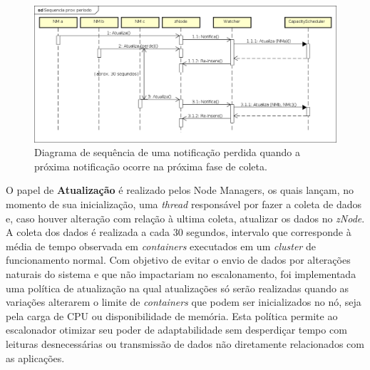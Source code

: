 \begin{figure}[!hbt]
   \centering
   \includegraphics[width=\textwidth]{figuras/seq-prox-per.png}
   \caption{Diagrama de sequência de uma notificação perdida quando a próxima notificação ocorre na próxima fase de coleta.}
   \label{fig:proximo}
\end{figure}

	
O papel de \textbf{Atualização} é realizado pelos Node Managers, os quais lançam, no momento de sua inicialização, uma \textit{thread} responsável por fazer a coleta de dados e, caso houver alteração com relação à ultima coleta, atualizar os dados no \textit{zNode}. A coleta dos dados é realizada a cada 30 segundos, intervalo que corresponde à média de tempo observada em \textit{containers} executados em um \textit{cluster} de funcionamento normal. Com objetivo de evitar o envio de dados por alterações naturais do sistema e que não impactariam no escalonamento, foi implementada uma política de atualização na qual atualizações só serão realizadas quando as variações alterarem o limite de \textit{containers} que podem ser inicializados no nó, seja pela carga de CPU ou disponibilidade de memória. Esta política permite ao escalonador otimizar seu poder de adaptabilidade sem desperdiçar tempo com leituras desnecessárias ou transmissão de dados não diretamente relacionados com as aplicações.

